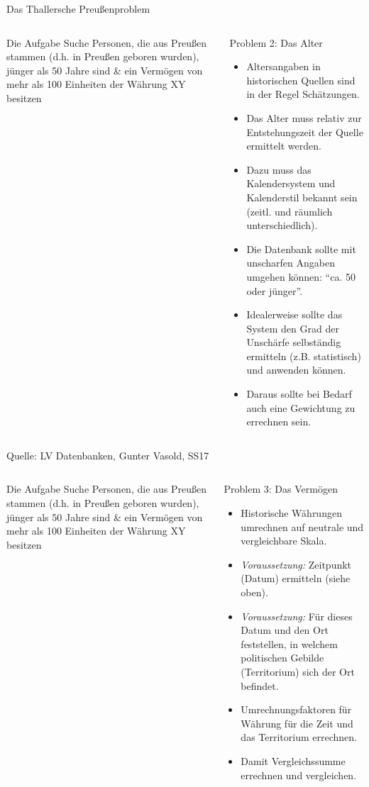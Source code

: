 \begin{frame}[allowframebreaks]{Das Thallersche Preußenproblem}
\begin{columns}
  \begin{exampleblock}{Die Aufgabe}\footnotesize
  Suche Personen, die aus Preußen stammen (d.h. in Preußen geboren wurden), jünger als 50 Jahre sind \& ein Vermögen von mehr als 100 Einheiten der Währung XY besitzen
  \end{exampleblock}
  \begin{alertblock}{Problem 2: Das Alter}\scriptsize
  \begin{itemize}
      \item Altersangaben in historischen Quellen sind in der Regel Schätzungen.
      \item Das Alter muss relativ zur Entstehungszeit der Quelle ermittelt werden.
      \item Dazu muss das Kalendersystem und Kalenderstil bekannt sein (zeitl. und räumlich unterschiedlich).
      \item Die Datenbank sollte mit unscharfen Angaben umgehen können: ``ca. 50 oder jünger''. 
      \item Idealerweise sollte das System den Grad der Unschärfe selbständig ermitteln (z.B. statistisch) und anwenden können.
      \item Daraus sollte bei Bedarf auch eine Gewichtung zu errechnen sein.
  \end{itemize}
  \end{alertblock}
\end{columns}
  
{\scriptsize\flushright Quelle: LV Datenbanken, Gunter Vasold, SS17

}

\framebreak 

\begin{columns}
  \begin{exampleblock}{Die Aufgabe}\footnotesize
  Suche Personen, die aus Preußen stammen (d.h. in Preußen geboren wurden), jünger als 50 Jahre sind \& ein Vermögen von mehr als 100 Einheiten der Währung XY besitzen
  \end{exampleblock}
  \begin{alertblock}{Problem 3: Das Vermögen}\scriptsize
  \begin{itemize}
      \item Historische Währungen umrechnen auf neutrale und vergleichbare Skala.
      \item \emph{Voraussetzung:} Zeitpunkt (Datum) ermitteln (siehe oben).
      \item \emph{Voraussetzung:} Für dieses Datum und den Ort feststellen, in welchem politischen Gebilde (Territorium) sich der Ort befindet.
      \item Umrechnungsfaktoren für Währung für die Zeit und das Territorium errechnen.
      \item Damit Vergleichssumme errechnen und vergleichen.
  \end{itemize}
  \end{alertblock}
\end{columns}


\end{frame}
